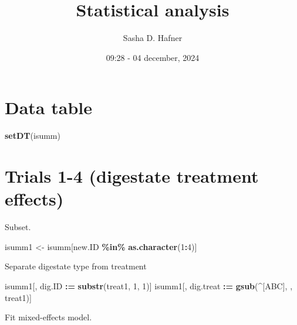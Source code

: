 \documentclass[
]{article}
\title{Statistical analysis}
\author{Sasha D. Hafner}
\date{09:28 - 04 december, 2024}
\newenvironment{Shaded}{\begin{snugshade}}{\end{snugshade}}
\newcommand{\DecValTok}[1]{\textcolor[rgb]{0.00,0.00,0.81}{#1}}
\newcommand{\FunctionTok}[1]{\textcolor[rgb]{0.13,0.29,0.53}{\textbf{#1}}}
\newcommand{\NormalTok}[1]{#1}
\newcommand{\OtherTok}[1]{\textcolor[rgb]{0.56,0.35,0.01}{#1}}
\newcommand{\SpecialCharTok}[1]{\textcolor[rgb]{0.81,0.36,0.00}{\textbf{#1}}}
\newcommand{\StringTok}[1]{\textcolor[rgb]{0.31,0.60,0.02}{#1}}
\begin{document}
\maketitle

\section{Data table}\label{data-table}

\begin{Shaded}
\begin{Highlighting}[]
\FunctionTok{setDT}\NormalTok{(isumm)}
\end{Highlighting}
\end{Shaded}

\section{Trials 1-4 (digestate treatment
effects)}\label{trials-1-4-digestate-treatment-effects}

Subset.

\begin{Shaded}
\begin{Highlighting}[]
\NormalTok{isumm1 }\OtherTok{\textless{}{-}}\NormalTok{ isumm[new.ID }\SpecialCharTok{\%in\%} \FunctionTok{as.character}\NormalTok{(}\DecValTok{1}\SpecialCharTok{:}\DecValTok{4}\NormalTok{)]}
\end{Highlighting}
\end{Shaded}

Separate digestate type from treatment

\begin{Shaded}
\begin{Highlighting}[]
\NormalTok{isumm1[, dig.ID }\SpecialCharTok{:=} \FunctionTok{substr}\NormalTok{(treat1, }\DecValTok{1}\NormalTok{, }\DecValTok{1}\NormalTok{)]}
\NormalTok{isumm1[, dig.treat }\SpecialCharTok{:=} \FunctionTok{gsub}\NormalTok{(}\StringTok{\textquotesingle{}\^{}[ABC]\textquotesingle{}}\NormalTok{, }\StringTok{\textquotesingle{}\textquotesingle{}}\NormalTok{, treat1)]}
\end{Highlighting}
\end{Shaded}

Fit mixed-effects model.
\end{document}
